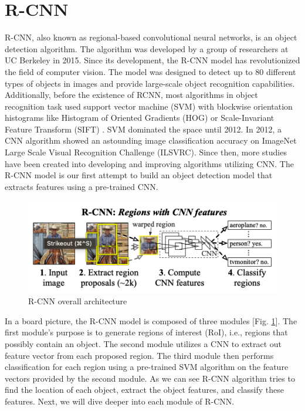 \section{R-CNN}

R-CNN, also known as regional-based convolutional neural networks, is an object detection algorithm. The algorithm was developed by a group of researchers at UC Berkeley in 2015. Since its development, the R-CNN model has revolutionized the field of computer vision. The model was designed to detect up to 80 different types of objects in images and provide large-scale object recognition capabilities. Additionally, before the existence of RCNN, most algorithms in object recognition task used support vector machine (SVM) with blockwise orientation histograms like Histogram of Oriented Gradients (HOG) \cite{svm_hog} or Scale-Invariant Feature Transform (SIFT) \cite{svm_sift}. SVM dominated the space until 2012. In 2012, a CNN algorithm showed an astounding image classification accuracy on ImageNet Large Scale Visual Recognition Challenge (ILSVRC). Since then, more studies have been created into developing and improving algorithms utilizing CNN. The R-CNN model is our first attempt to build an object detection model that extracts features using a pre-trained CNN.

\begin{figure}[!ht]
    \centering
    \includegraphics[width=4.5in]{figures/rcnn_archiet.png}
    \caption{R-CNN overall architecture \cite{Girshick_R_CNN_2013}} \label{fig:rcnn_archiet}
\end{figure}

In a board picture, the R-CNN model is composed of three modules [Fig. \ref{fig:rcnn_archiet}]. The first module's purpose is to generate regions of interest (RoI), i.e., regions that possibly contain an object. The second module utilizes a CNN to extract out feature vector from each proposed region. The third module then performs classification for each region using a pre-trained SVM algorithm on the feature vectors provided by the second module. As we can see R-CNN algorithm tries to find the location of each object, extract the object features, and classify these features. Next, we will dive deeper into each module of R-CNN.

